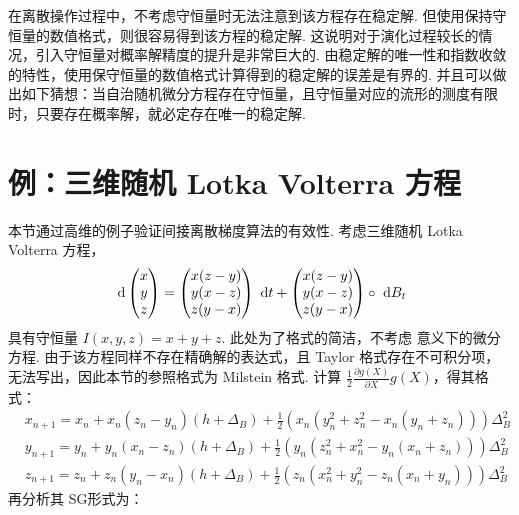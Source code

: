 在离散操作过程中，不考虑守恒量时无法注意到该方程存在稳定解. 但使用保持守恒量的数值格式，则很容易得到该方程的稳定解. 这说明对于演化过程较长的情况，引入守恒量对概率解精度的提升是非常巨大的. 由稳定解的唯一性和指数收敛的特性，使用保守恒量的数值格式计算得到的稳定解的误差是有界的. 
并且可以做出如下猜想：当自治随机微分方程存在守恒量，且守恒量对应的流形的测度有限时，只要存在概率解，就必定存在唯一的稳定解. 


\section{例：三维随机 Lotka Volterra 方程}
本节通过高维的例子验证间接离散梯度算法的有效性. 考虑三维随机 Lotka Volterra 方程，
\begin{equation}\label{eq6.7}
\text{ d} 
\begin{pmatrix} x \\y \\z \end{pmatrix}
=
\begin{pmatrix}x(z-y) \\y(x-z) \\z(y-x)\end{pmatrix} \text{ d} t
+
\begin{pmatrix} x(z-y) \\y(x-z) \\z(y-x)\end{pmatrix} \circ \text{ d} B_t
\end{equation}
具有守恒量 $I(x,y,z) = x+y+z$. 
此处为了格式的简洁，不考虑 \ito 意义下的微分方程. 
由于该方程同样不存在精确解的表达式，且 Taylor 格式存在不可积分项，无法写出，因此本节的参照格式为 Milstein 格式. 计算 $\frac12 \frac {\partial g(X)}{\partial X} g(X)$，得其格式：
\[
\begin{aligned}
&x_{n+1}=x_{n}+x_{n}\left(z_{n}-y_{n}\right)(h+\Delta _B)
	+\frac{1}{2}\left(x_{n}\left(y_{n}^{2}+z_{n}^{2}-x_{n}\left(y_{n}+z_{n}\right)\right)\right) \Delta_B^2\\
&y_{n+1}=y_{n}+y_{n}\left(x_{n}-z_{n}\right)(h+\Delta _B)
	+\frac{1}{2}\left(y_{n}\left(z_{n}^{2}+x_{n}^{2}-y_{n}\left(x_{n}+z_{n}\right)\right)\right) \Delta_B^2\\
&z_{n+1}=z_{n}+z_{n}\left(y_{n}-x_{n}\right)(h+\Delta _B)
	+\frac{1}{2}\left(z_{n}\left(x_{n}^{2}+y_{n}^{2}-z_{n}\left(x_{n}+y_{n}\right)\right)\right)\Delta_B^2
\end{aligned}
\]
再分析其 SG形式为：
